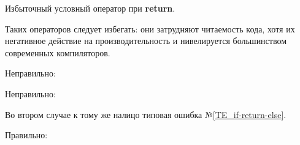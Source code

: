 \begin{typerror}
	\label{TE_if-return-return}
	Избыточный условный оператор при \textbf{return}.

	Таких операторов следует избегать: они затрудняют читаемость кода,
	хотя их негативное действие на производительность и нивелируется большинством современных компиляторов.

	Неправильно:

	Неправильно:

	Во втором случае к тому же налицо типовая ошибка №\ref{TE_if-return-else}.

	Правильно:

	
\end{typerror}
